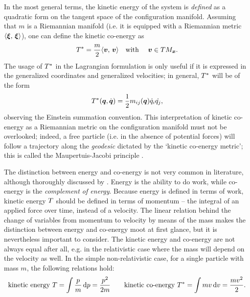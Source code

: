 In the most general terms, the kinetic energy of the system is \emph{defined} as a quadratic form on the tangent space of the configuration manifold. Assuming that $m$ is a Riemannian manifold (i.e. it is equipped with a Riemannian metric $\langle \vb*{\xi},\, \vb*{\xi}\rangle$), one can define the kinetic co-energy as
\begin{equation}
    \ecokin = \frac{m}{2}\inner{\vec{v}}{\vec{v}}\qq{with } \vec{v} \in TM_{\vec{x}}.
    \label{eq:ekin_mfld}
\end{equation}
The usage of $T^*$ in the Lagrangian formulation is only useful if it is expressed in the generalized coordinates and generalized velocities; in general, $T^*$ will be of the form
\begin{equation}
    T^*(\vb*{q}, \dot{\vb*{q}}) = \frac{1}{2}m_{ij}(\vb*{q})\dot{q}_i\dot{q_j},
    \label{eq:kinetic_energy}
\end{equation}
observing the Einstein summation convention. This interpretation of kinetic co-energy as a Riemannian metric on the configuration manifold must not be overlooked; indeed, a free particle (i.e. in the absence of potential forces) will follow a trajectory along the \emph{geodesic} dictated by the `kinetic co-energy metric'; this is called the Maupertuis-Jacobi principle \cite{Arnold1989}.

The distinction between energy and co-energy is not very common in literature, although thoroughly discussed by \citet{Jeltsema2009}. Energy is the ability to do work, while co-energy is the \emph{complement of energy}. Because energy is defined in terms of work, kinetic energy $T$ should be defined in terms of momentum -- the integral of an applied force over time, instead of a velocity. The linear relation behind the change of variables from momentum to velocity by means of the mass makes the distinction between energy and co-energy moot at first glance, but it is nevertheless important to consider. The kinetic energy and co-energy are not always equal after all, e.g. in the relativistic case where the mass will depend on the velocity as well. In the simple non-relativistic case, for a single particle with mass $m$, the following relations hold:
$$ \text{kinetic energy } T = \int \frac{p}{m}\dd{p} = \frac{p^2}{2m}\qquad
   \text{kinetic co-energy } T^* = \int m v \dd{v} = \frac{mv^2}{2}.$$

